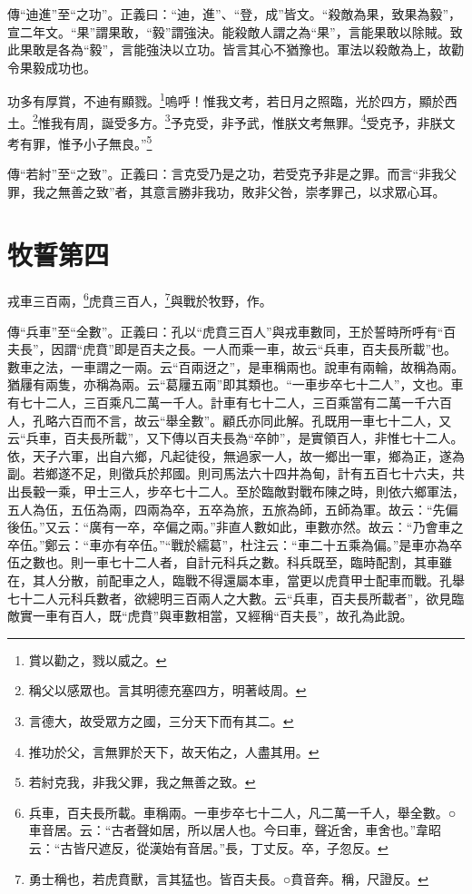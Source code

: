 {\noindent\zhuan{}\fzbyks 傳“迪進”至“之功”。正義曰：“迪，進”、“登，成”皆文。“殺敵為果，致果為毅”，宣二年文。“果”謂果敢，“毅”謂強決。能殺敵人謂之為“果”，言能果敢以除賊。致此果敢是各為“毅”，言能強決以立功。皆言其心不猶豫也。軍法以殺敵為上，故勸令果毅成功也。 \par}

功多有厚賞，不迪有顯戮。\footnote{賞以勸之，戮以威之。}嗚呼！惟我文考，若日月之照臨，光於四方，顯於西土。\footnote{稱父以感眾也。言其明德充塞四方，明著岐周。}惟我有周，誕受多方。\footnote{言德大，故受眾方之國，三分天下而有其二。}予克受，非予武，惟朕文考無罪。\footnote{推功於父，言無罪於天下，故天佑之，人盡其用。}受克予，非朕文考有罪，惟予小子無良。”\footnote{若紂克我，非我父罪，我之無善之致。}

{\noindent\zhuan{}\fzbyks 傳“若紂”至“之致”。正義曰：言克受乃是之功，若受克予非是之罪。而言“非我父罪，我之無善之致”者，其意言勝非我功，敗非父咎，崇孝罪己，以求眾心耳。 \par}

\section{牧誓第四}


戎車三百兩，\footnote{兵車，百夫長所載。車稱兩。一車步卒七十二人，凡二萬一千人，舉全數。○車音居。云：“古者聲如居，所以居人也。今曰車，聲近舍，車舍也。”韋昭云：“古皆尺遮反，從漢始有音居。”長，丁丈反。卒，子忽反。}虎賁三百人，\footnote{勇士稱也，若虎賁獸，言其猛也。皆百夫長。○賁音奔。稱，尺證反。}與戰於牧野，作。

{\noindent\zhuan{}\fzbyks 傳“兵車”至“全數”。正義曰：孔以“虎賁三百人”與戎車數同，王於誓時所呼有“百夫長”，因謂“虎賁”即是百夫之長。一人而乘一車，故云“兵車，百夫長所載”也。數車之法，一車謂之一兩。云“百兩迓之”，是車稱兩也。說車有兩輪，故稱為兩。猶屨有兩隻，亦稱為兩。云“葛屨五兩”即其類也。“一車步卒七十二人”，文也。車有七十二人，三百乘凡二萬一千人。計車有七十二人，三百乘當有二萬一千六百人，孔略六百而不言，故云“舉全數”。顧氏亦同此解。孔既用一車七十二人，又云“兵車，百夫長所載”，又下傳以百夫長為“卒帥”，是實領百人，非惟七十二人。依，天子六軍，出自六鄉，凡起徒役，無過家一人，故一鄉出一軍，鄉為正，遂為副。若鄉遂不足，則徵兵於邦國。則司馬法六十四井為甸，計有五百七十六夫，共出長轂一乘，甲士三人，步卒七十二人。至於臨敵對戰布陳之時，則依六鄉軍法，五人為伍，五伍為兩，四兩為卒，五卒為旅，五旅為師，五師為軍。故云：“先偏後伍。”又云：“廣有一卒，卒偏之兩。”非直人數如此，車數亦然。故云：“乃會車之卒伍。”鄭云：“車亦有卒伍。”“戰於繻葛”，杜注云：“車二十五乘為偏。”是車亦為卒伍之數也。則一車七十二人者，自計元科兵之數。科兵既至，臨時配割，其車雖在，其人分散，前配車之人，臨戰不得還屬本車，當更以虎賁甲士配車而戰。孔舉七十二人元科兵數者，欲總明三百兩人之大數。云“兵車，百夫長所載者”，欲見臨敵實一車有百人，既“虎賁”與車數相當，又經稱“百夫長”，故孔為此說。 \par}

